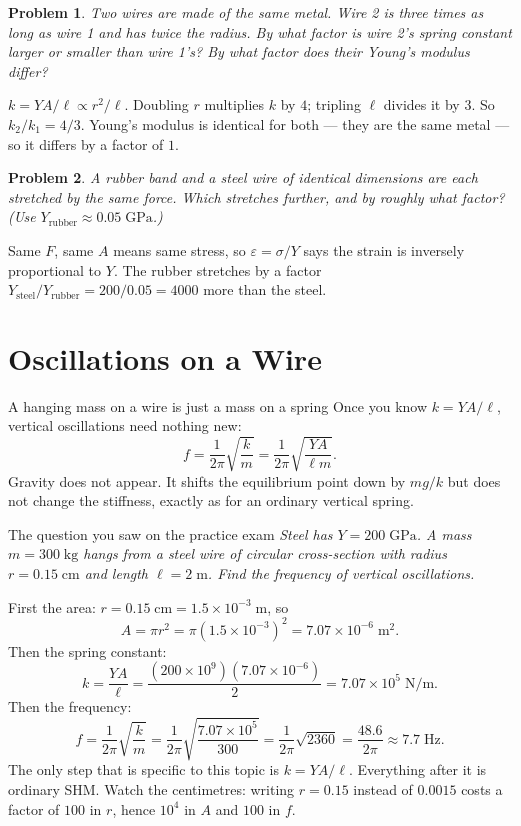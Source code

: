 \documentclass[11pt]{article}
\newcommand{\clearpts}{\addtocounter{tpts}{\value{cpts}} \setcounter{cpts}{0}}
\newcommand{\pts}[1]{\clearpts \setcounter{cpts}{#1}}
\theoremstyle{mystyle}
\newtheorem{pproblem}{Problem}
\begin{document}
\pts{3}
\begin{pproblem}
Two wires are made of the same metal. Wire 2 is three times as long as wire 1 and has
twice the radius. By what factor is wire 2's spring constant larger or smaller than wire
1's? By what factor does their Young's modulus differ?
\end{pproblem}
\begin{solution}
$k = YA/\ell \propto r^2/\ell$. Doubling $r$ multiplies $k$ by $4$; tripling $\ell$
divides it by $3$. So $k_2/k_1 = 4/3$. Young's modulus is identical for both --- they are
the same metal --- so it differs by a factor of $1$.
\end{solution}

\pts{3}
\begin{pproblem}
A rubber band and a steel wire of identical dimensions are each stretched by the same
\emph{force}. Which stretches further, and by roughly what factor? (Use
$Y_{\text{rubber}} \approx 0.05\;\mathrm{GPa}$.)
\end{pproblem}
\begin{solution}
Same $F$, same $A$ means same stress, so $\varepsilon = \sigma/Y$ says the strain is
inversely proportional to $Y$. The rubber stretches by a factor
$Y_{\text{steel}}/Y_{\text{rubber}} = 200/0.05 = 4000$ more than the steel.
\end{solution}

\section{Oscillations on a Wire}

\begin{psidea}{A hanging mass on a wire is just a mass on a spring}{}
Once you know $k = YA/\ell$, vertical oscillations need nothing new:
\[
f = \frac{1}{2\pi}\sqrt{\frac{k}{m}}
= \frac{1}{2\pi}\sqrt{\frac{YA}{\ell m}}.
\]
Gravity does not appear. It shifts the equilibrium point down by $mg/k$ but does not
change the stiffness, exactly as for an ordinary vertical spring.
\end{psidea}

\begin{psexample}{The question you saw on the practice exam}{}
\emph{Steel has $Y = 200\;\mathrm{GPa}$. A mass $m = 300\;\mathrm{kg}$ hangs from a steel
wire of circular cross-section with radius $r = 0.15\;\mathrm{cm}$ and length
$\ell = 2\;\mathrm{m}$. Find the frequency of vertical oscillations.}

First the area: $r = 0.15\;\mathrm{cm} = 1.5\times 10^{-3}\;\mathrm{m}$, so
\[
A = \pi r^2 = \pi (1.5\times10^{-3})^2 = 7.07\times 10^{-6}\;\mathrm{m}^2.
\]
Then the spring constant:
\[
k = \frac{YA}{\ell} = \frac{(200\times10^{9})(7.07\times10^{-6})}{2}
= 7.07\times 10^{5}\;\mathrm{N/m}.
\]
Then the frequency:
\[
f = \frac{1}{2\pi}\sqrt{\frac{k}{m}}
= \frac{1}{2\pi}\sqrt{\frac{7.07\times10^{5}}{300}}
= \frac{1}{2\pi}\sqrt{2360}
= \frac{48.6}{2\pi} \approx 7.7\;\mathrm{Hz}.
\]
The only step that is specific to this topic is $k = YA/\ell$. Everything after it is
ordinary SHM. Watch the centimetres: writing $r = 0.15$ instead of $0.0015$ costs a
factor of $100$ in $r$, hence $10^4$ in $A$ and $100$ in $f$.
\end{psexample}
\end{document}
